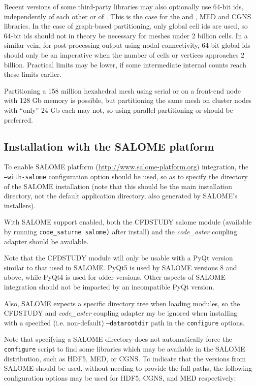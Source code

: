\documentclass[a4paper,10pt,twoside]{csshortdoc}
\begin{document}
Recent versions of some third-party libraries may also optionally use 64-bit ids,
independently of each other or of \CS.
This is the case for the \scotch and \metis, MED and
CGNS libraries. In the case of graph-based partitioning, only
global cell ids are used, so 64-bit ids should not in theory be necessary
for meshes under 2 billion cells. In a similar vein, for post-processing output
using nodal connectivity, 64-bit global ids should only be an imperative
when the number of cells or vertices approaches 2 billion.
Practical limits may be lower, if some intermediate internal counts
reach these limits earlier.

Partitioning a 158 million hexahedral mesh using serial  or \scotch
on a front-end node with 128 Gb memory is possible,
but partitioning the same mesh on cluster nodes with ``only'' 24 Gb each
may not, so using parallel partitioning \ptscotch or \parmetis
should be preferred.

\subsection{Installation with the SALOME platform\label{sec:config:salome}}

To enable SALOME platform (\url{http://www.salome-platform.org}) integration,
the \texttt{--with-salome} configuration option should be used, so as to
specify the directory of the SALOME installation (note that this should be
the main installation directory, not the default application directory,
also generated by SALOME's installers).

With SALOME support enabled, both the CFDSTUDY salome module
(available by running \texttt{code\_saturne salome)} after install)
and the \textit{code\_aster} coupling adapter should be available.

Note that the CFDSTUDY module will only be usable with a PyQt
version similar to that used in SALOME. PyQt5 is used by SALOME
versions 8 and above, while PyQt4 is used for older versions.
Other aspects of SALOME integration should not be impacted by an incompatible
PyQt version.

Also, SALOME expects a specific directory tree when loading modules,
so the CFDSTUDY and \textit{code\_aster} coupling adapter my be
ignored when installing with a specified (i.e. non-default)
\texttt{--datarootdir} path in the \CS \texttt{configure} options.

Note that specifying a SALOME directory does not automatically
force the \CS \texttt{configure} script to find some libraries
which may be available in the SALOME distribution, such as HDF5,
MED, or CGNS. To indicate that the versions from SALOME should be used,
without needing to provide the full paths, the following configuration
options may be used for HDF5, CGNS, and MED respectively:
\end{document}
